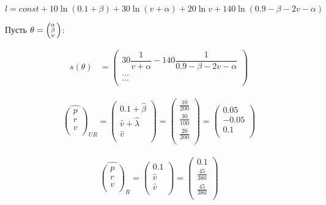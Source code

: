 \documentclass[12pt]{article} %
\theoremstyle{definition} %
\def \hlambda{\hat{\lambda}}
\def \hbeta{\hat{\beta}}
\newcommand{\tvect}[3]{%
   \ensuremath{\Bigl(\negthinspace\begin{smallmatrix}#1\\#2\\#3\end{smallmatrix}\Bigr)}}
\begin{document}
\begin{equation}
    l = const + 10 \ln (0.1 + \beta) + 30 \ln (v+\alpha) + 20 \ln v +  140 \ln (0.9 - \beta - 2v - \alpha)
\end{equation}

\bigskip
Пусть $\theta = \tvect{\alpha}{\beta}{v}$: 

\begin{align}
    s (\theta) &=  \begin{pmatrix}
           30\dfrac{1}{v+\alpha} - 140\dfrac{1}{0.9-\beta-2v-\alpha} \\
           \hdots \\
           \hdots \\
         \end{pmatrix}
  \end{align}

\begin{align}
    \hat{\begin{pmatrix}
           p \\
           r \\
           v \\
         \end{pmatrix}}_{UR} = \begin{pmatrix}
           0.1 + \hbeta \\
           \hat{v} + \hlambda \\
           \hat{v} \\
         \end{pmatrix} = \begin{pmatrix}
           \frac{10}{200} \\
           \frac{30}{100} \\
           \frac{20}{200} \\
         \end{pmatrix} = \begin{pmatrix}
           0.05 \\
           -0.05 \\
           0.1 \\
         \end{pmatrix}
  \end{align}


\begin{align}
    \hat{\begin{pmatrix}
           p \\
           r \\
           v \\
         \end{pmatrix}}_{R} = \begin{pmatrix}
           0.1  \\
           \hat{v} \\
           \hat{v} \\
         \end{pmatrix} =\begin{pmatrix}
           0.1 \\
           \frac{45}{380} \\
           \frac{45}{380} \\
         \end{pmatrix}
  \end{align}
\end{document}

